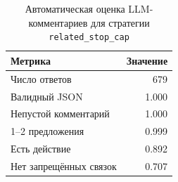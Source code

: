 \begin{table}[H]
\centering
\caption{Автоматическая оценка LLM-комментариев для стратегии \texttt{related\_stop\_cap}}
\label{tab:llm-quality}
\begin{tabular}{lr}
\toprule
Метрика & Значение \\
\midrule
Число ответов & 679 \\
Валидный JSON & 1.000 \\
Непустой комментарий & 1.000 \\
1--2 предложения & 0.999 \\
Есть действие & 0.892 \\
Нет запрещённых связок & 0.707 \\
\bottomrule
\end{tabular}
\end{table}

